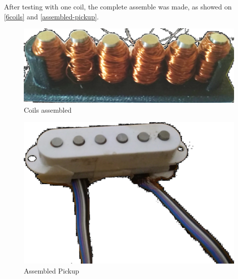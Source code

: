 After testing with one coil, the complete assemble was made, as showed on \autoref{6coils}
and \autoref{assembled-pickup}.

\begin{figure}[!htpb]
  \centering
  \caption{Coils assembled}
  \label{6coils}
  \includegraphics[scale=0.08]{images/6coils}
\end{figure}

\begin{figure}[!htpb]
  \centering
  \caption{Assembled Pickup}
  \label{assembled-pickup}
  \includegraphics[scale=0.08]{images/assembled-pickup}
\end{figure}
